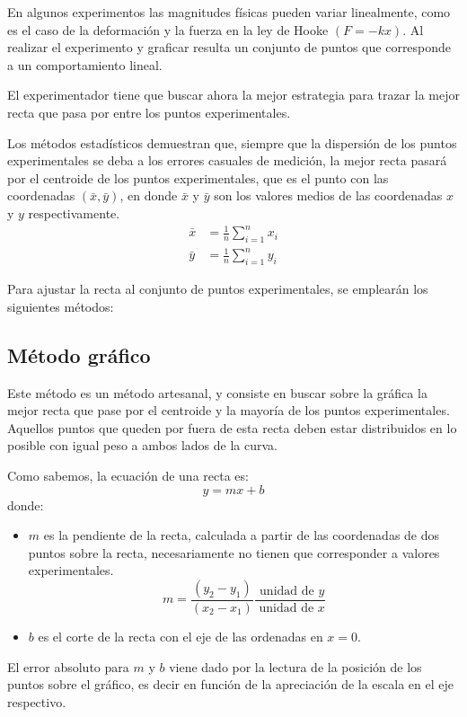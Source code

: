 En algunos experimentos las magnitudes f\'isicas pueden variar linealmente, como es el caso de la deformaci\'on y la fuerza en la ley de Hooke $(F = -kx)$. Al realizar el experimento y graficar resulta  un conjunto de puntos que corresponde a un comportamiento lineal. 

El experimentador tiene que buscar ahora la mejor estrategia  para trazar la mejor recta que pasa por entre los puntos experimentales.

Los m\'etodos estad\'isticos demuestran que, siempre que la dispersi\'on de los puntos experimentales  se deba a los errores casuales de medici\'on, la mejor recta pasar\'a por el centroide de los puntos experimentales, que es el punto con las coordenadas
$(\bar{x}, \bar{y})$, en donde $\bar{x}$ y $\bar{y}$  son los  valores medios de las coordenadas $x$ y $y$ respectivamente.
\begin{equation}
\begin{aligned}
\bar{x} & =\frac{1}{n}{\sum_{i=1}^n x_i} \\
\bar{y} & =\frac{1}{n}{\sum_{i=1}^n y_i}
\end{aligned}
\end{equation}


Para ajustar la recta al conjunto de puntos experimentales, se emplear\'an los siguientes m\'etodos:

\subsection{M\'etodo gr\'afico}
Este m\'etodo es un m\'etodo artesanal, y consiste en buscar sobre la gr\'afica la mejor recta que pase  por el centroide y la mayor\'ia de los puntos experimentales. Aquellos puntos que queden por fuera de esta recta deben estar distribuidos en lo posible con igual peso a ambos lados de la curva.

Como sabemos, la ecuaci\'on de una recta es:
$$
y=m x+b
$$
donde:
\begin{itemize}
\item $m$ es la pendiente de la recta, calculada a partir de las coordenadas de dos puntos sobre la recta, necesariamente no tienen que corresponder a valores experimentales.
$$
m=\frac{\left(y_2-y_1\right)}{\left(x_2-x_1\right)} \frac{\text { unidad de } y}{\text { unidad de } x}
$$
\item  $b$ es el corte de la recta con el eje de las ordenadas en $x=0$.
\end{itemize}

El error absoluto para $m$ y $b$ viene dado por la lectura de la posici\'on de los puntos sobre el gr\'afico, es decir en funci\'on de la apreciaci\'on de la escala en el eje respectivo.


